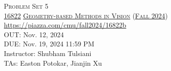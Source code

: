 \documentclass[11pt,addpoints,answers]{exam}
\title{\textsc{\hwName}} %
\author{}
\date{}
\date{}
\numberwithin{equation}{section} %
\numberwithin{figure}{section} %
\numberwithin{table}{section} %
\newcommand{\courseNum}{\href{https://geometric3d.github.io}{16822}}
\newcommand{\courseName}{\href{https://geometric3d.github.io}{Geometry-based Methods in Vision}}
\newcommand{\courseSem}{\href{https://geometric3d.github.io}{Fall 2024}}
\newcommand{\courseUrl}{\url{https://piazza.com/cmu/fall2024/16822b}}
\newcommand{\hwNum}{Problem Set 5}
\newcommand{\hwTopic}{Parametrizing Rotations and Learning-based Reconstruction}
\newcommand{\outDate}{Nov. 12, 2024}
\newcommand{\dueDate}{Nov. 19, 2024 11:59 PM}
\newcommand{\instructorName}{Shubham Tulsiani}
\newcommand{\taNames}{Easton Potokar, Jianjin Xu}
\begin{document}
\section*{}
\begin{center}
    \textsc{\LARGE \hwNum} \\
    \vspace{1em}
    \textsc{\large \courseNum{} \courseName{} (\courseSem)} \\
    \courseUrl\\
    \vspace{1em}
    OUT: \outDate \\
    DUE: \dueDate \\
    Instructor: \instructorName \\
    TAs: \taNames
\end{center}



\clearpage



\clearpage


\end{document}
